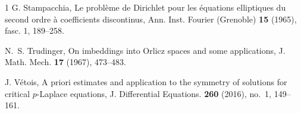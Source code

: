 \documentclass[reqno, 11pt]{amsart} %
\numberwithin{equation}{section}
\theoremstyle{definition}
\begin{document}
\begin{thebibliography}{1}
     G. Stampacchia, Le probl\`eme de Dirichlet pour les \'equations elliptiques du second ordre \`a{} coefficients discontinus, Ann. Inst. Fourier (Grenoble) {\bf 15} (1965), fasc. 1, 189--258.


    N.~S. Trudinger, On imbeddings into Orlicz spaces and some applications, J. Math. Mech. {\bf 17} (1967), 473--483.

     J. V\'etois, A priori estimates and application to the symmetry of solutions for critical $p$-Laplace equations, J. Differential Equations. {\bf 260} (2016), no.~1, 149--161.

\end{thebibliography}
\end{document}
